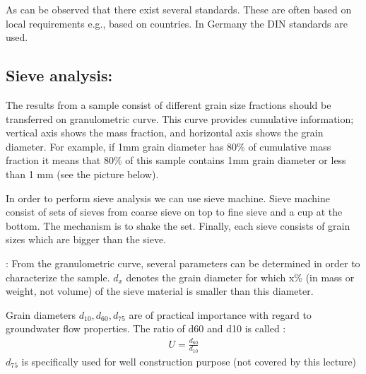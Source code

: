 \documentclass[letterpaper,10pt,english]{sphinxmanual}
\let\sphinxpxdimen\pdfpxdimen\else\newdimen\sphinxpxdimen
\begin{document}
As can be observed that there exist several standards. These are often based on local requirements e.g., based on countries. In Germany the DIN standards are used.


\subsection{Sieve analysis:}
\label{\detokenize{contents/flow/12_subsurface_structure:sieve-analysis}}
The results from a sample consist of different grain size fractions should be transferred on granulometric curve. This curve provides cumulative information; vertical axis shows the mass fraction, and horizontal axis shows the grain diameter. For example, if 1mm grain diameter has 80\% of cumulative mass fraction it means that 80\% of this sample contains 1mm grain diameter or less than 1 mm (see the picture below).

In order to perform sieve analysis we can use sieve machine. Sieve machine consist of sets of sieves from coarse sieve on top to fine sieve and a cup at the bottom. The mechanism is to shake the set. Finally, each sieve consists of grain sizes which are bigger than the sieve.

\noindent{\hspace*{\fill}\sphinxincludegraphics[height=400\sphinxpxdimen]{{L02_fig8}.png}\hspace*{\fill}}

: From the granulometric curve, several parameters can be determined in order to characterize the sample. \({d_{x}}\)   denotes the grain diameter for which x\% (in mass or weight, not volume) of the sieve material is smaller than this diameter.

\noindent{\hspace*{\fill}\sphinxincludegraphics[height=400\sphinxpxdimen]{{L02_fig9}.png}\hspace*{\fill}}

Grain diameters \({d_{10}}, {d_{60}}, {d_{75}}\) are of practical importance with regard to groundwater flow properties. The     ratio of d60 and d10 is called :
\begin{equation*}
\begin{split}{U}=\frac{d_{60}}{d_{10}}\end{split}
\end{equation*}
\({d_{75}}\) is specifically used for well construction purpose (not covered by this lecture)
\end{document}
